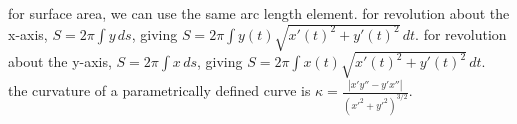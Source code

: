 \documentclass{article}
\begin{document}
for surface area, we can use the same arc length element. for revolution about the x-axis, $S=2\pi\int y\,ds$, giving $S=2\pi\int y(t)\sqrt{x'(t)^2+y'(t)^2}\,dt$. for revolution about the y-axis, $S=2\pi\int x\,ds$, giving $S=2\pi\int x(t)\sqrt{x'(t)^2+y'(t)^2}\,dt$.\\

the curvature of a parametrically defined curve is $\kappa=\frac{|x'y''-y'x''|}{(x'^2+y'^2)^{3/2}}$.
\end{document}
